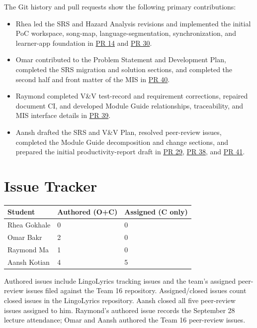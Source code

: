 \documentclass{article}
\begin{document}
The Git history and pull requests show the following primary contributions:
\begin{itemize}
    \item Rhea led the SRS and Hazard Analysis revisions and implemented the
    initial PoC workspace, song-map, language-segmentation, synchronization,
    and learner-app foundation in
    \href{https://github.com/rhea333/LingoLyrics/pull/14}{PR 14} and
    \href{https://github.com/rhea333/LingoLyrics/pull/30}{PR 30}.
    \item Omar contributed to the Problem Statement and Development Plan,
    completed the SRS migration and solution sections, and completed the
    second half and front matter of the MIS in
    \href{https://github.com/rhea333/LingoLyrics/pull/40}{PR 40}.
    \item Raymond completed V\&V test-record and requirement corrections,
    repaired document CI, and developed Module Guide relationships,
    traceability, and MIS interface details in
    \href{https://github.com/rhea333/LingoLyrics/pull/39}{PR 39}.
    \item Aansh drafted the SRS and V\&V Plan, resolved peer-review issues,
    completed the Module Guide decomposition and change sections, and prepared
    the initial productivity-report draft in
    \href{https://github.com/rhea333/LingoLyrics/pull/29}{PR 29},
    \href{https://github.com/rhea333/LingoLyrics/pull/38}{PR 38}, and
    \href{https://github.com/rhea333/LingoLyrics/pull/41}{PR 41}.
\end{itemize}

\section{Issue Tracker}

\begin{table}[H]
\centering
\begin{tabular}{lll}
\toprule
\textbf{Student} & \textbf{Authored (O+C)} & \textbf{Assigned (C only)}\\
\midrule
Rhea Gokhale & 0 & 0 \\
Omar Bakr & 2 & 0 \\
Raymond Ma & 1 & 0 \\
Aansh Kotian & 4 & 5 \\
\bottomrule
\end{tabular}
\end{table}

Authored issues include LingoLyrics tracking issues and the team's assigned
peer-review issues filed against the Team 16 repository.  Assigned/closed
issues count closed issues in the LingoLyrics repository.  Aansh closed all
five peer-review issues assigned to him.  Raymond's authored issue records the
September 28 lecture attendance; Omar and Aansh authored the Team 16 peer-review
issues.
\end{document}
